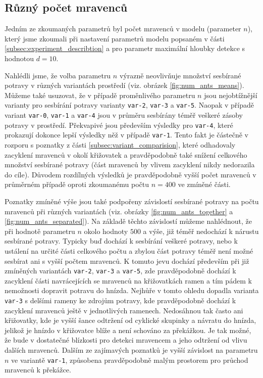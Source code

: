 \documentclass[10pt,a4paper,twocolumn]{article}
\begin{document}
\subsection{Různý počet mravenců}

Jedním ze zkoumaných parametrů byl počet mravenců v modelu (parameter
$n$), který jsme zkoumali při nastavení parametrů modelu popsaném v části 
\ref{subsec:experiment_describtion} a pro parametr maximální
hloubky detekce s hodnotou $d=10$.

Nahlédli jsme, že volba parametru $n$ výrazně neovlivňuje 
množství sesbírané potravy v různých variantách prostředí 
(viz. obrázek \ref{fig:num_ants_means}). Můžeme také usuzovat, že v případě 
proměnlivého parametru $n$ jsou nejobtížnější varianty pro
sesbírání potravy varianty \texttt{var-2}, \texttt{var-3} a \texttt{var-5}.
Naopak v případě variant \texttt{var-0}, \texttt{var-1} a \texttt{var-4}
jsou v průměru sesbírány téměř veškeré zásoby potravy v prostředí.
Překvapivé jsou především výsledky pro \texttt{var-4}, které prokazují
dokonce lepší výsledky něž v případě \texttt{var-1}. Tento fakt je 
částečně v rozporu s poznatky z části \ref{subsec:variant_comparision},
které odhadovaly zacyklení mravenců v okolí křižovatek a pravděpodobně
také snížení celkového množství sesbírané potravy (část mravenců
by vlivem zacyklení nikdy nedorazila do cíle). Důvodem rozdílných 
výsledků je pravděpodobně vyšší počet mravenců v průměrném případě 
oproti zkoumanému počtu $n=400$ ve zmíněné části.

Poznatky zmíněné výše jsou také podpořeny závislostí sesbírané potravy 
na počtu mravenců při různých variantách (viz. obrázky 
\ref{fig:num_ants_together} a \ref{fig:num_ants_separated}).
Na základě těchto závislostí můžeme nahlédnout, že při hodnotě 
parametru $n$ okolo hodnoty $500$ a výše, již téměř nedochází k nárustu
sesbírané potravy. Typicky buď dochází k sesbírání veškeré potravy, 
nebo k ustálení na určité části celkového počtu a zbylou část
potravy téměř není možné sesbírat ani s vyšší počtem mravenců. 
K tomuto jevu dochází především při již zmíněných variantách 
\texttt{var-2}, \texttt{var-3} a \texttt{var-5}, zde pravděpodobně
dochází k zacyklení části navrácejících se mravenců na křižovatkách
ramen a tím pádem k nemožnosti dopravit potravu do hnízda. Nejhůře v 
tomto ohledu dopadla varianta \texttt{var-3} s delšími rameny 
ke zdrojům potravy, kde pravděpodobně dochází k zacyklení mravenců ještě 
v jednotlivých ramenech. Nedosáhnou tak často ani křižovatky, kde je 
vyšší šance odtržení od cyklické skupinky a návratu do hnízda, jelikož
je hnízdo v křižovatce blíže a není schováno za překážkou. Je tak možné,
že bude v dostatečné blízkosti pro detekci mravencem a jeho odtržení od
vlivu dalších mravenců. Dalším ze zajímavých poznatků je vyšší závislost
na parametru $n$ ve variantě \texttt{var-1}, způsobena pravděpodobně
malým prostorem pro průchod mravenců k překážce.
\end{document}
